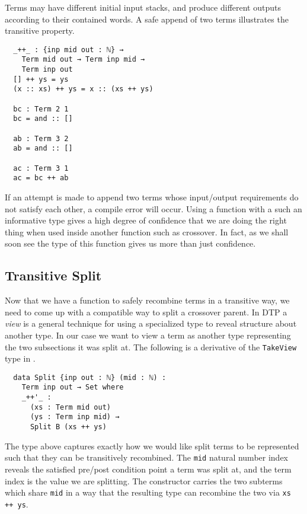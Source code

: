 \documentclass[runningheads,a4paper]{llncs}
\begin{document}
Terms may have different initial input stacks, and produce
different outputs according to their contained words. A safe append
of two terms illustrates the transitive property. 

\begin{verbatim}
  _++_ : {inp mid out : ℕ} →
    Term mid out → Term inp mid →
    Term inp out
  [] ++ ys = ys
  (x :: xs) ++ ys = x :: (xs ++ ys)

  bc : Term 2 1
  bc = and :: []

  ab : Term 3 2
  ab = and :: []

  ac : Term 3 1
  ac = bc ++ ab
\end{verbatim}

If an attempt is made to append two terms whose input/output
requirements do not satisfy each other, a compile error will
occur. Using a function with a such an informative type gives a high
degree of confidence that we are doing the right thing when used
inside another function such as crossover. In fact, as we shall soon
see the type of this function gives us more than just confidence.

\subsection{Transitive Split}

Now that we have a function to safely recombine terms in a transitive
way, we need to come up with a compatible way to split a crossover
parent. In DTP a \textit{view} \cite{mcbride:viewleft} is a general technique for using a
specialized type to reveal structure about another type. In our case
we want to view a term as another type representing the two
subsections it was split at. The following is a derivative of the
\texttt{TakeView} type in \cite{oury:tpop}.

\begin{verbatim}
  data Split {inp out : ℕ} (mid : ℕ) :
    Term inp out → Set where
    _++'_ :
      (xs : Term mid out)
      (ys : Term inp mid) →
      Split B (xs ++ ys)
\end{verbatim}

The type above captures exactly how we would like split terms to be
represented such that they can be transitively recombined. The
\texttt{mid} natural number index reveals the satisfied
pre/post condition point a term was split at, and the term index is the
value we are splitting. The constructor carries the two
subterms which share \texttt{mid} in a way that the resulting type can
recombine the two via \texttt{xs ++ ys}.
\end{document}
